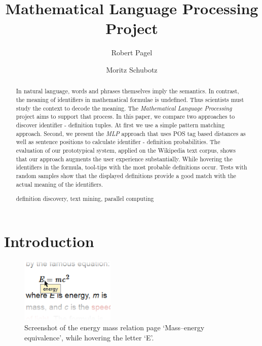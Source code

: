 \documentclass[runningheads]{llncs}
\newcommand{\keywords}[1]{\par\addvspace\baselineskip
\noindent\keywordname\enspace\ignorespaces#1}
\begin{document}
\mainmatter

\title{Mathematical Language Processing \\ Project}

\author{Robert Pagel \and Moritz Schubotz}



\maketitle


\begin{abstract}

In natural language, words and phrases themselves imply the semantics. In
contrast, the meaning of identifiers in mathematical formulae is undefined.
Thus scientists must study the context to decode the meaning. The
\emph{Mathematical Language Processing} project aims to support that process.
In this paper, we compare two approaches to discover identifier - definition tuples.
At first we use a simple pattern matching
approach. Second, we present the \emph{MLP} approach that uses POS tag based
distances as well as sentence positions to calculate identifier - definition
probabilities.
The evaluation of our prototypical system, applied on the
Wikipedia text corpus, shows that our approach augments the user experience
substantially. While hovering the identifiers in the formula, tool-tips with
the most probable definitions occur. Tests with random samples show that the
displayed definitions provide a good match with the actual meaning of the
identifiers.

\keywords{definition discovery, text mining, parallel computing}
\end{abstract}


\section{Introduction}

\begin{figure}
\label{fig:screenshot}
\vspace{-20pt}
	\includegraphics[width=0.4\textwidth]{screenshot}
\caption{Screenshot of the energy mass relation page `Mass–energy equivalence', while hovering the letter `E'.}
\vspace{-20pt}
\end{figure}
\end{document}
